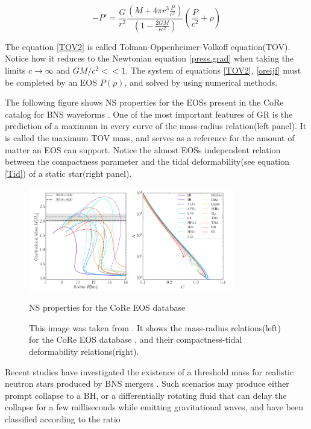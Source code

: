 \begin{equation}\label{TOV2}
- P' = \frac{G}{r^2} \frac{\left( M + 4\pi r^3 \frac{P}{c^2} \right)}{\left(  1 - \frac{2GM}{r c^2} \right)} \left( \frac{P}{c^2}+\rho \right)
\end{equation}

The equation \ref{TOV2} is called Tolman-Oppenheimer-Volkoff equation(TOV). Notice how it reduces to the Newtonian equation \ref{press.grad} when taking the limits $c\rightarrow \infty$ and $GM/c^2 <<1$. The system of equations \ref{TOV2}, \ref{oreijf} must be completed by an EOS $P(\rho)$, and solved by using numerical methods.

The following figure shows NS properties for the EOSs present in the CoRe catalog for BNS waveforms \cite{Dietrich:2018phi}. One of the most important features of GR is the prediction of a maximum in every curve of the mass-radius relation(left panel). It is called the maximum TOV mass, and serves as a reference for the amount of matter an EOS can support. Notice the almost EOSs independent relation between the compactness parameter and the tidal deformability(see equation \ref{Tid}) of a static star(right panel). 

\begin{figure}[hbt!]
\begin{center}
\includegraphics[width=0.8\textwidth, angle=0]{images/EOS_TOV.png}
\captionsetup{width=.8\textwidth}
\caption{NS properties for the CoRe EOS database}
\caption*{This image was taken from \cite{EOSDB}. It shows the mass-radius relations(left) for the CoRe EOS database \cite{Dietrich:2018phi}, and their compactness-tidal deformability relations(right).}
\label{equations of state and tidal deformability}
\end{center}
\end{figure}

\FloatBarrier

Recent studies have investigated the existence of a threshold mass for realistic neutron stars produced by BNS mergers \cite{Kashyap_2022}. Such scenarios may produce either prompt collapse to a BH, or a differentially rotating fluid that can delay the collapse for a few milliseconds while emitting gravitational waves, and have been classified according to the ratio

